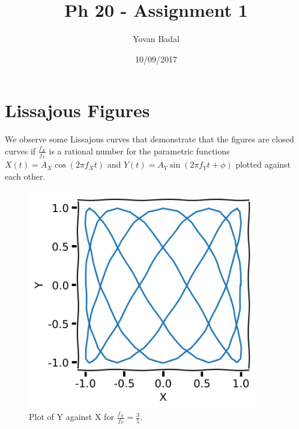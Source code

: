 \documentclass[11pt]{article}
\begin{document}
	\title{Ph 20 - Assignment 1}
	\author{Yovan Badal}
	\date{10/09/2017}
	\maketitle
	
\section{Lissajous Figures}
We observe some Lissajous curves that demonstrate that the figures are closed curves if $\frac{f_X}{f_Y}$ is a rational number for the parametric functions $X(t)   =A_X \cos(2\pi f_X t)$ and $Y(t)   =A_Y \sin(2\pi f_Y t + \phi)$ plotted against each other.

\begin{figure}[htp]
\centering
	\begin{minipage}{0.45\textwidth}
	\centering
	\includegraphics[width=0.9\textwidth]{lissajous_3_5_1_1_0_0.01_100.png}
	\caption{Plot of Y against X for $\frac{f_X}{f_Y}=\frac{3}{5}$.}
	\label{ratio35}
	\end{minipage}\hfill	
	\begin{minipage}{0.45\textwidth}
	\centering

\end{minipage}
\end{figure}
\end{document}
